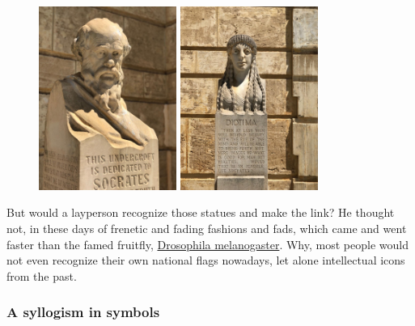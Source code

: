 \documentclass[
  11pt,
  british,
  a4paper,
]{article}
\begin{document}
\begin{figure}[h]
  \begin{minipage}[b]{0.5\textwidth}
    \centering
    \includegraphics[height=60mm]{images/socrates-close-up.jpg}
  \end{minipage}\hfill
  \begin{minipage}[b]{0.5\textwidth}
    \centering
    \includegraphics[height=60mm]{images/diotima-2.jpg}
  \end{minipage}
\end{figure}

But would a layperson recognize those statues and make the link? He
thought not, in these days of frenetic and fading fashions and fads,
which came and went faster than the famed fruitfly,
\href{https://en.wikipedia.org/wiki/Drosophila_melanogaster\#Lifecycle_and_reproduction}{Drosophila
melanogaster}. Why, most people would not even recognize their own
national flags nowadays, let alone intellectual icons from the past.

\hypertarget{a-syllogism-in-symbols}{%
\subsubsection{A syllogism in symbols}\label{a-syllogism-in-symbols}}
\end{document}
